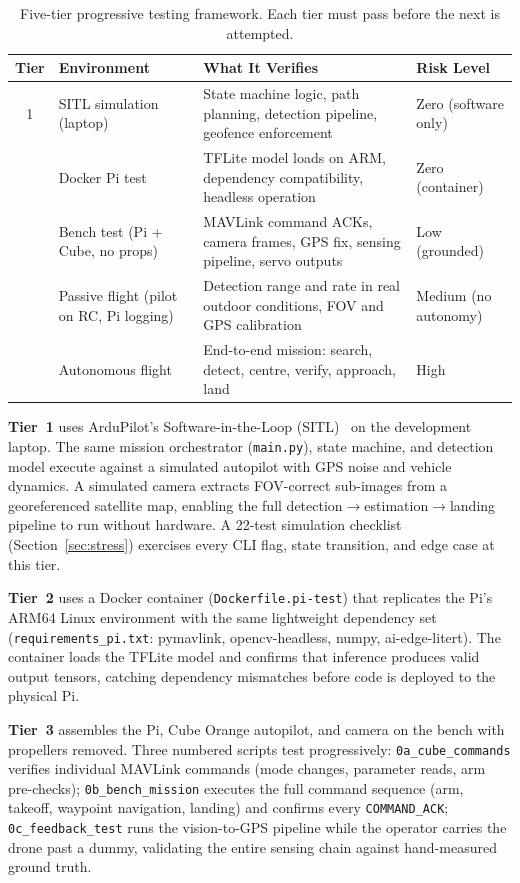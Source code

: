 \begin{table}[H]
\centering
\caption{Five-tier progressive testing framework. Each tier must pass before the next is attempted.}
\label{tab:five-tier}
\small
\begin{tabular}{@{}clp{5.5cm}p{4.0cm}@{}}
\toprule
\textbf{Tier} & \textbf{Environment} & \textbf{What It Verifies} & \textbf{Risk Level} \\
\midrule
1 & SITL simulation (laptop) & State machine logic, path planning, detection pipeline, geofence enforcement & Zero (software only) \\
\addlinespace
2 & Docker Pi test & TFLite model loads on ARM, dependency compatibility, headless operation & Zero (container) \\
\addlinespace
3 & Bench test (Pi + Cube, no props) & MAVLink command ACKs, camera frames, GPS fix, sensing pipeline, servo outputs & Low (grounded) \\
\addlinespace
4 & Passive flight (pilot on RC, Pi logging) & Detection range and rate in real outdoor conditions, FOV and GPS calibration & Medium (no autonomy) \\
\addlinespace
5 & Autonomous flight & End-to-end mission: search, detect, centre, verify, approach, land & High \\
\bottomrule
\end{tabular}
\end{table}

\textbf{Tier~1} uses ArduPilot's Software-in-the-Loop (SITL)~\cite{ardupilot2024} on the development laptop. The same mission orchestrator (\texttt{main.py}), state machine, and detection model execute against a simulated autopilot with GPS noise and vehicle dynamics. A simulated camera extracts FOV-correct sub-images from a georeferenced satellite map, enabling the full detection$\to$estimation$\to$landing pipeline to run without hardware. A 22-test simulation checklist (Section~\ref{sec:stress}) exercises every CLI flag, state transition, and edge case at this tier.

\textbf{Tier~2} uses a Docker container (\texttt{Dockerfile.pi-test}) that replicates the Pi's ARM64 Linux environment with the same lightweight dependency set (\texttt{requirements\_pi.txt}: pymavlink, opencv-headless, numpy, ai-edge-litert). The container loads the TFLite model and confirms that inference produces valid output tensors, catching dependency mismatches before code is deployed to the physical Pi.

\textbf{Tier~3} assembles the Pi, Cube Orange autopilot, and camera on the bench with propellers removed. Three numbered scripts test progressively: \texttt{0a\_cube\_commands} verifies individual MAVLink commands (mode changes, parameter reads, arm pre-checks); \texttt{0b\_bench\_mission} executes the full command sequence (arm, takeoff, waypoint navigation, landing) and confirms every \texttt{COMMAND\_ACK}; \texttt{0c\_feedback\_test} runs the vision-to-GPS pipeline while the operator carries the drone past a dummy, validating the entire sensing chain against hand-measured ground truth.


